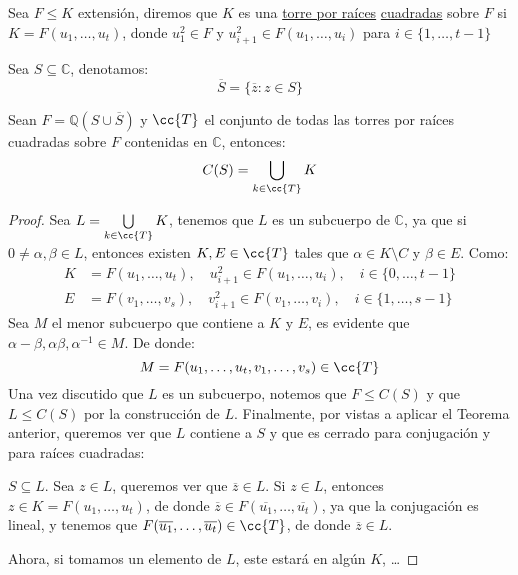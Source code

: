 \begin{definicion}
    Sea $F\leq K$ extensión, diremos que $K$ es una \underline{torre por raíces} \underline{cuadradas} sobre $F$ si $K = F(u_1, \ldots, u_t)$, donde $u_1^2 \in F$ y $u_{i+1}^2 \in F(u_1, \ldots, u_i)$ para $i \in \{1,\ldots,t-1\}$
\end{definicion}

\begin{notacion}
    Sea $S\subseteq \mathbb{C}$, denotamos:
    \begin{equation*}
        \overline{S} = \{\overline{z}:z\in S\}
    \end{equation*}
\end{notacion}

\begin{teo}
    Sean $F = \mathbb{Q}(S\cup \overline{S})$ y $\cc{T}$ el conjunto de todas las torres por raíces cuadradas sobre $F$ contenidas en $\mathbb{C}$, entonces:
    \begin{equation*}
        C(S) = \bigcup_{k\in \cc{T}}K
    \end{equation*}
    \begin{proof}
        Sea $L = \bigcup\limits_{k\in \cc{T}}K$, tenemos que $L$ es un subcuerpo de $\mathbb{C}$, ya que si $0\neq\alpha,\beta\in L$, entonces existen $K,E\in \cc{T}$ tales que $\alpha\in K\setminus C$ y $\beta\in E$. Como:
            \begin{align*}
                K &= F(u_1, \ldots, u_t),\quad  u_{i+1}^2 \in F(u_1, \ldots, u_i), \quad i \in \{0,\ldots,t-1\} \\
                E &= F(v_1, \ldots, v_s),\quad  v_{i+1}^2 \in F(v_1, \ldots, v_i), \quad i \in \{1,\ldots, s-1\}
            \end{align*}
        Sea $M$ el menor subcuerpo que contiene a $K$ y $E$, es evidente que $\alpha-\beta,\alpha\beta, \alpha^{-1}\in M$. De donde:
        \begin{equation*}
            M = F(u_1,\ldots,u_t, v_1,\ldots,v_s) \in \cc{T}
        \end{equation*}
        Una vez discutido que $L$ es un subcuerpo, notemos que $F\leq C(S)$ y que $L\leq C(S)$ por la construcción de $L$. Finalmente, por vistas a aplicar el Teorema anterior, queremos ver que $L$ contiene a $S$ y que es cerrado para conjugación y para raíces cuadradas:

        $S\subseteq L$. Sea $z\in L$, queremos ver que $\overline{z}\in L$. Si $z\in L$, entonces $z\in K=F(u_1,\ldots,u_t)$, de donde $\overline{z}\in F(\overline{u_1},\ldots,\overline{u_t})$, ya que la conjugación es lineal, y tenemos que $F(\overline{u_1},\ldots,\overline{u_t})\in \cc{T}$, de donde $\overline{z}\in L$.

        Ahora, si tomamos un elemento de $L$, este estará en algún $K$, \ldots %
    \end{proof}
\end{teo}

